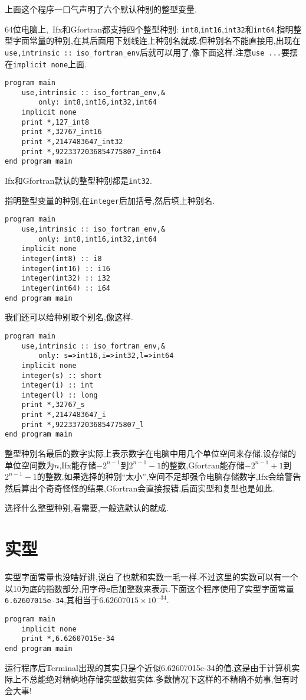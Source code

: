 上面这个程序一口气声明了六个默认种别的整型变量.

64位电脑上,~Ifx和Gfortran都支持四个整型种别: \texttt{int8},\texttt{int16},\texttt{int32}和\texttt{int64}.指明整型字面常量的种别,在其后面用下划线连上种别名就成.但种别名不能直接用,出现在\texttt{use,intrinsic :: iso\_{}fortran\_{}env}后就可以用了,像下面这样.注意\texttt{use ...}要摆在\texttt{implicit none}上面.
\begin{lstlisting}
program main
    use,intrinsic :: iso_fortran_env,&
        only: int8,int16,int32,int64
    implicit none
    print *,127_int8
    print *,32767_int16
    print *,2147483647_int32
    print *,9223372036854775807_int64
end program main
\end{lstlisting}

Ifx和Gfortran默认的整型种别都是\texttt{int32}.

指明整型变量的种别,在\texttt{integer}后加括号,然后填上种别名.
\begin{lstlisting}
program main
    use,intrinsic :: iso_fortran_env,&
        only: int8,int16,int32,int64
    implicit none
    integer(int8) :: i8
    integer(int16) :: i16
    integer(int32) :: i32
    integer(int64) :: i64
end program main
\end{lstlisting}

我们还可以给种别取个别名,像这样.
\begin{lstlisting}
program main
    use,intrinsic :: iso_fortran_env,&
        only: s=>int16,i=>int32,l=>int64
    implicit none
    integer(s) :: short
    integer(i) :: int
    integer(l) :: long
    print *,32767_s
    print *,2147483647_i
    print *,9223372036854775807_l
end program main
\end{lstlisting}

整型种别名最后的数字实际上表示数字在电脑中用几个单位空间来存储.设存储的单位空间数为$n$,Ifx能存储$-2^{n-1}$到$2^{n-1}-1$的整数,Gfortran能存储$-2^{n-1}+1$到$2^{n-1}-1$的整数.如果选择的种别``太小'',空间不足却强令电脑存储数字,Ifx会给警告然后算出个奇奇怪怪的结果,Gfortran会直接报错.后面实型和复型也是如此.

选择什么整型种别,看需要,一般选默认的就成.

\section{实型}

实型字面常量也没啥好讲,说白了也就和实数一毛一样.不过这里的实数可以有一个以10为底的指数部分,用字母\texttt{e}后加整数来表示.下面这个程序使用了实型字面常量\texttt{6.62607015e-34},其相当于$6.62607015\times10^{-34}$.
\begin{lstlisting}
program main
    implicit none
    print *,6.62607015e-34
end program main
\end{lstlisting}
运行程序后Terminal出现的其实只是个近似6.62607015e-34的值,这是由于计算机实际上不总能绝对精确地存储实型数据实体.多数情况下这样的不精确不妨事,但有时会大事!

